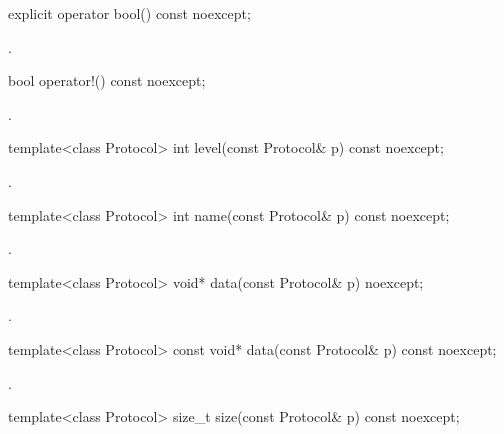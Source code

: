 \begin{itemdecl}
explicit operator bool() const noexcept;
\end{itemdecl}

\begin{itemdescr}
\pnum
\returns {}.
\end{itemdescr}

\begin{itemdecl}
bool operator!() const noexcept;
\end{itemdecl}

\begin{itemdescr}
\pnum
\returns {}.
\end{itemdescr}

\begin{itemdecl}
template<class Protocol> int level(const Protocol& p) const noexcept;
\end{itemdecl}

\begin{itemdescr}
\pnum
\returns {}.
\end{itemdescr}

\begin{itemdecl}
template<class Protocol> int name(const Protocol& p) const noexcept;
\end{itemdecl}

\begin{itemdescr}
\pnum
\returns {}.
\end{itemdescr}

\begin{itemdecl}
template<class Protocol> void* data(const Protocol& p) noexcept;
\end{itemdecl}

\begin{itemdescr}
\pnum
\returns {}.
\end{itemdescr}

\begin{itemdecl}
template<class Protocol> const void* data(const Protocol& p) const noexcept;
\end{itemdecl}

\begin{itemdescr}
\pnum
\returns {}.
\end{itemdescr}

\begin{itemdecl}
template<class Protocol> size_t size(const Protocol& p) const noexcept;
\end{itemdecl}

